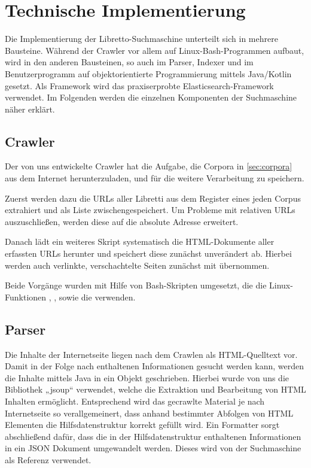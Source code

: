 \section{Technische Implementierung}
Die Implementierung der Libretto-Suchmaschine unterteilt sich
in mehrere Bausteine.
Während der Crawler vor allem auf Linux-Bash-Programmen aufbaut,
wird in den anderen Bausteinen, so auch im Parser, Indexer und im Benutzerprogramm
auf objektorientierte Programmierung mittels Java/Kotlin gesetzt.
Als Framework wird das praxiserprobte Elasticsearch-Framework verwendet.
Im Folgenden werden die einzelnen Komponenten der Suchmaschine
näher erklärt.

\subsection{Crawler}
Der von uns entwickelte Crawler hat die Aufgabe,
die Corpora in \ref{sec:corpora} aus dem Internet herunterzuladen,
und für die weitere Verarbeitung zu speichern.

Zuerst werden dazu die URLs aller Libretti aus dem Register
eines jeden Corpus extrahiert und als Liste zwischengespeichert.
Um Probleme mit relativen URLs auszuschließen,
werden diese auf die absolute Adresse erweitert.

Danach lädt ein weiteres Skript systematisch die HTML-Dokumente
aller erfassten URLs herunter
und speichert diese zunächst unverändert ab.
Hierbei werden auch verlinkte, verschachtelte Seiten zunächst mit übernommen.

Beide Vorgänge wurden mit Hilfe von Bash-Skripten umgesetzt,
die die Linux-Funktionen , ,
sowie die  verwenden.

\subsection{Parser}
Die Inhalte der Internetseite liegen nach dem Crawlen
als HTML-Quelltext vor.
Damit in der Folge nach enthaltenen Informationen gesucht werden kann,
werden die Inhalte mittels Java in ein Objekt geschrieben.
Hierbei wurde von uns die Bibliothek „jsoup“ verwendet,
welche die Extraktion und Bearbeitung von HTML Inhalten ermöglicht.
Entsprechend wird das gecrawlte Material je nach Internetseite
so verallgemeinert, dass anhand bestimmter Abfolgen von HTML Elementen
die Hilfsdatenstruktur korrekt gefüllt wird.
Ein Formatter sorgt abschließend dafür,
dass die in der Hilfsdatenstruktur enthaltenen Informationen
in ein JSON Dokument umgewandelt werden.
Dieses wird von der Suchmaschine als Referenz verwendet.

